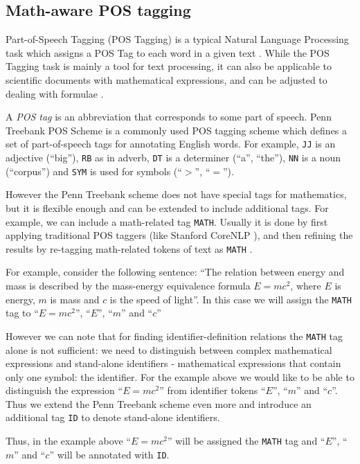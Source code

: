 \subsection{Math-aware POS tagging} \label{sec:postagging}
Part-of-Speech Tagging (POS Tagging) is a typical Natural Language Processing
task which assigns a POS Tag to each word in a given text \cite{jurafsky2000speech}.
While the POS Tagging task is mainly a tool for text processing, it can
also be applicable to scientific documents with mathematical expressions,
and can be adjusted to dealing with formulae \cite{schoneberg2014pos}
\cite{pagael2014mlp}.

A \emph{POS tag} is an abbreviation that corresponds to some
part of speech. Penn Treebank POS Scheme \cite{santorini1990part} is
a commonly used POS tagging scheme which defines a set of part-of-speech tags
for annotating English words.
For example, \texttt{JJ} is an adjective (``big''), \texttt{RB} as in adverb,
\texttt{DT} is a determiner (``a'', ``the''), \texttt{NN} is a
noun (``corpus'') and \texttt{SYM} is used for symbols (``$>$'', ``$=$'').


However the Penn Treebank scheme does not have special tags for mathematics,
but it is flexible enough and can be extended to include additional tags.
For example, we can include a math-related tag \texttt{MATH}.
Usually it is done by first applying traditional POS taggers (like Stanford
CoreNLP \cite{manning2014stanford}), and then
refining the results by re-tagging math-related tokens of text as \texttt{MATH}
\cite{schoneberg2014pos}.


For example, consider the following sentence:
``The relation between energy and mass is
described by  the mass-energy equivalence formula $E = mc^2$,
where $E$ is energy, $m$ is mass and $c$ is the speed of light''.
In this case we will assign the \verb|MATH| tag to ``$E = mc^2$'', ``$E$'',
``$m$'' and ``$c$''

However we can note that for finding identifier-definition relations
the \texttt{MATH} tag alone is not sufficient: we need to distinguish
between complex mathematical expressions and stand-alone identifiers -
mathematical expressions that contain only one symbol: the identifier.
For the example above we would like to be able to distinguish the
expression ``$E = mc^2$'' from identifier tokens ``$E$'',
``$m$'' and ``$c$''. Thus we extend the Penn Treebank scheme even more
and introduce an additional tag \texttt{ID} to denote stand-alone identifiers.


Thus, in the example above ``$E = mc^2$'' will be assigned the \texttt{MATH} tag
and ``$E$'', ``$m$'' and ``$c$'' will be annotated with \texttt{ID}.

